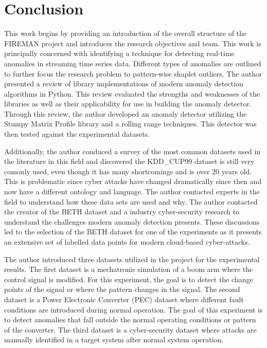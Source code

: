 \section{Conclusion}
\label{sec:conclusion}

This work begins by providing an introduction of the overall structure of the FIREMAN project and introduces the research objectives and team. This work is principally concerned with identifying a technique for detecting real-time anomalies in streaming time series data. Different types of anomalies are outlined to further focus the research problem to pattern-wise shaplet outliers. The author presented a review of library implementations of modern anomaly detection algorithms in Python. This review evaluated the strengths and weaknesses of the libraries as well as their applicability for use in building the anomaly detector. Through this review, the author developed an anomaly detector utilizing the Stumpy Matrix Profile library and a rolling range techniques. This detector was then tested against the experimental datasets. 

Additionally, the author conduced a survey of the most common datasets used in the literature in this field and discovered the KDD\_CUP99 dataset is still very comonly used, even though it has many shortcomings and is over 20 years old. This is problematic since cyber attacks have changed dramatically since then and now have a different ontology and language. The author contacted experts in the field to understand how these data sets are used and why. The author contacted the creator of the BETH dataset and a industry cyber-security research to understand the challenges modern anomaly detection presents. These discussions led to the selection of the BETH dataset for one of the experiments as it presents an extensive set of labelled data points for modern cloud-based cyber-attacks.

The author introduced three datasets utilized in the project for the experimental results. The first dataset is a mechatronic simulation of a boom arm where the control signal is modified. For this experiment, the goal is to detect the change points of the signal or where the pattern changes in the signal. The second dataset is a Power Electronic Converter (PEC) dataset where different fault conditions are introduced during normal operation. The goal of this experiment is to detect anomalies that fall outside the normal operating conditions or pattern of the converter. The third dataset is a cyber-security dataset where attacks are manually identified in a target system after normal system operation.

